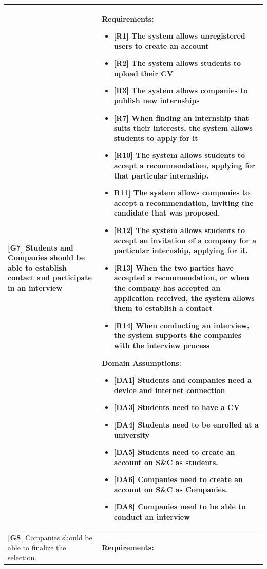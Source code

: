 \begin{longtable}{|p{}|p{}|}
\textbf{[G7]} Students and Companies should be able to establish contact and participate in an interview 
& 
\textbf{Requirements:}
\begin{itemize}
    \item \textbf{[R1]} The system allows unregistered users to create an account
    \item \textbf{[R2]} The system allows students to upload their CV
    \item \textbf{[R3]} The system allows companies to publish new internships
    \item \textbf{[R7]} When finding an internship that suits their interests, the system allows students to apply for it
    \item  \textbf{[R10]} The system allows students to accept a recommendation, applying for that particular internship.
    \item  \textbf{R11]} The system allows companies to accept a recommendation, inviting the candidate that was proposed.
    \item \textbf{[R12]} The system allows students to accept an invitation of a company for a particular internship, applying for it.
    \item \textbf{[R13]} When the two parties have accepted a recommendation, or when the company has accepted an application received, the system allows them to establish a contact
    \item \textbf{[R14]} When conducting an interview, the system supports the companies with the interview process 
\end{itemize}
\textbf{Domain Assumptions:}
\begin{itemize}
    \item \textbf{[DA1]} Students and companies need a device and internet connection
     \item \textbf{[DA3]} Students need to have a CV
     \item \textbf{[DA4]} Students need to be enrolled at a university
    \item \textbf{[DA5]} Students need to create an account on S\&C as students.
    \item \textbf{[DA6]} Companies need to create an account on S\&C as Companies.
    \item \textbf{[DA8]} Companies need to be able to conduct an interview
\end{itemize} \\
\hline
\textbf{[G8]} Companies should be able to finalize the selection. 
& 
\textbf{Requirements:}

\end{longtable}
